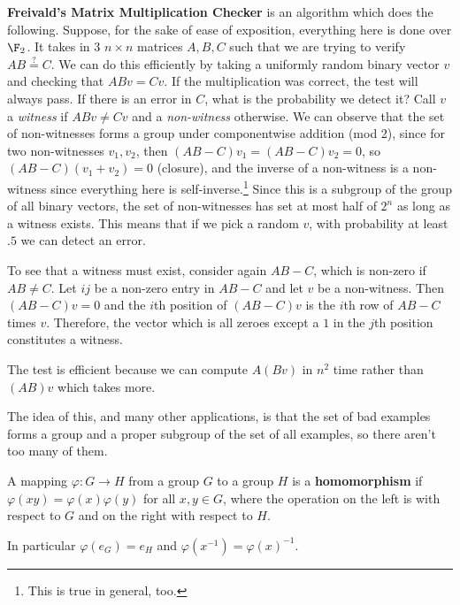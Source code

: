\begin{example}
	\textbf{Freivald's Matrix Multiplication Checker} is an algorithm which does the following.  Suppose, for the sake of ease of exposition, everything here is done over $\F_2$.  It takes in 3 $n\times n$ matrices $A,B,C$ such that we are trying to verify $AB\overset{?}{=}C$.  We can do this efficiently by taking a uniformly random binary vector $v$ and checking that $ABv = Cv$.  If the multiplication was correct, the test will always pass.  If there is an error in $C$, what is the probability we detect it? Call $v$ a \textit{witness} if $ABv\neq Cv$ and a \textit{non-witness} otherwise.  We can observe that the set of non-witnesses forms a group under componentwise addition (mod 2), since for two non-witnesses $v_1,v_2$, then $(AB-C)v_1 = (AB-C)v_2 = 0$, so $(AB-C)(v_1+v_2)=0$ (closure), and the inverse of a non-witness is a non-witness since everything here is self-inverse.\footnote{This is true in general, too.}  Since this is a subgroup of the group of all binary vectors, the set of non-witnesses has set at most half of $2^n$ as long as a witness exists.  This means that if we pick a random $v$, with probability at least $.5$ we can detect an error.
	
	To see that a witness must exist, consider again $AB-C$, which is non-zero if $AB\neq C$.  Let $ij$ be a non-zero entry in $AB-C$ and let $v$ be a non-witness. Then $(AB-C)v=0$ and the $i$th position of $(AB-C)v$ is the $i$th row of $AB-C$ times $v$.  Therefore, the vector which is all zeroes except a $1$ in the $j$th position constitutes a witness.
	
	The test is efficient because we can compute $A(Bv)$ in $n^2$ time rather than $(AB)v$ which takes more.  
\end{example}

The idea of this, and many other applications, is that the set of bad examples forms a group and a proper subgroup of the set of all examples, so there aren't too many of them.

\begin{definition}
	A mapping $\varphi:G\rightarrow H$ from a group $G$ to a group $H$ is a \textbf{homomorphism} if $\varphi(xy) = \varphi(x)\varphi(y)$ for all $x,y\in G$, where the operation on the left is with respect to $G$ and on the right with respect to $H$.
	
	In particular $\varphi(e_G) = e_H$ and $\varphi(x^{-1}) = \varphi(x)^{-1}$.
\end{definition}

